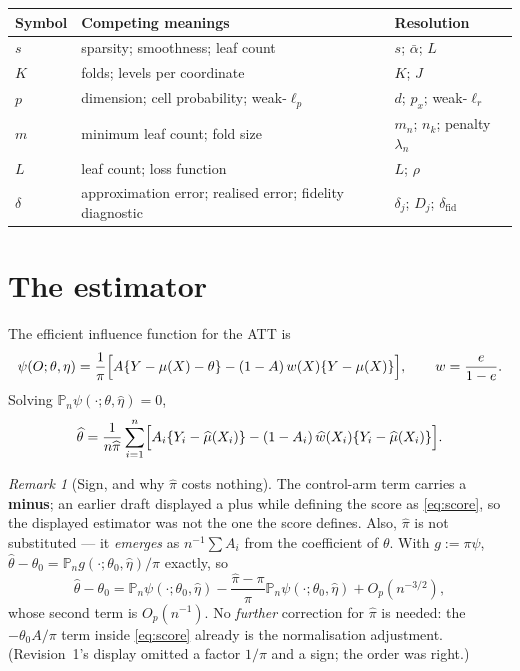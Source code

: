 \documentclass[11pt]{article}
\theoremstyle{plain}
\theoremstyle{definition}
\theoremstyle{remark}
\newtheorem{remark}{Remark}
\newcommand{\Pn}{\mathbb{P}_n}
\newcommand{\mhat}{\widehat{\mu}}
\newcommand{\what}{\widehat{w}}
\newcommand{\thetahat}{\widehat{\theta}}
\newcommand{\pihat}{\widehat{\pi}}
\begin{document}
\begin{center}\begin{tabular}{@{}lp{5.8cm}l@{}}
\toprule
Symbol & Competing meanings & Resolution \\ \midrule
$s$ & sparsity; smoothness; leaf count &
  $s$; $\bar\alpha$; $L$ \\
$K$ & folds; levels per coordinate & $K$; $J$ \\
$p$ & dimension; cell probability; weak-$\ell_p$ & $d$; $p_x$; weak-$\ell_r$ \\
$m$ & minimum leaf count; fold size & $m_n$; $n_k$; penalty $\lambda_n$ \\
$L$ & leaf count; loss function & $L$; $\rho$ \\
$\delta$ & approximation error; realised error; fidelity diagnostic &
  $\delta_j$; $D_j$; $\delta_{\mathrm{fid}}$ \\
\bottomrule
\end{tabular}\end{center}

\section{The estimator}

The efficient influence function for the ATT \citep{hahn1998} is
\begin{equation}\label{eq:score}
  \psi(O;\theta,\eta)=\frac1\pi\Bigl[A\{Y-\mu(X)-\theta\}
   -(1-A)\,w(X)\{Y-\mu(X)\}\Bigr],\qquad w=\frac e{1-e}.
\end{equation}
Solving $\Pn\psi(\cdot;\theta,\widehat\eta)=0$,
\begin{equation}\label{eq:att-estimator}
  \thetahat=\frac1{n\pihat}\sum_{i=1}^n\Bigl[A_i\{Y_i-\mhat(X_i)\}
   -(1-A_i)\,\what(X_i)\{Y_i-\mhat(X_i)\}\Bigr].
\end{equation}

\begin{remark}[Sign, and why $\pihat$ costs nothing]\label{rem:sign}
The control-arm term carries a \textbf{minus}; an earlier draft displayed a plus
while defining the score as \eqref{eq:score}, so the displayed estimator was not
the one the score defines. Also, $\pihat$ is not substituted --- it \emph{emerges}
as $n^{-1}\sum A_i$ from the coefficient of $\theta$. With $g:=\pi\psi$,
$\thetahat-\theta_0=\Pn g(\cdot;\theta_0,\widehat\eta)/\pihat$ exactly, so
\[
 \thetahat-\theta_0=\Pn\psi(\cdot;\theta_0,\widehat\eta)
  -\frac{\pihat-\pi}{\pi}\Pn\psi(\cdot;\theta_0,\widehat\eta)+O_p(n^{-3/2}),
\]
whose second term is $O_p(n^{-1})$. No \emph{further} correction for $\pihat$ is
needed: the $-\theta_0A/\pi$ term inside \eqref{eq:score} already is the
normalisation adjustment. (Revision~1's display omitted a factor $1/\pi$ and a
sign; the order was right.)
\end{remark}
\end{document}
